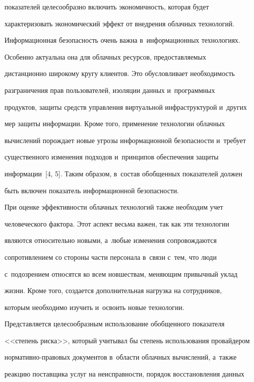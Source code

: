 показателей целесообразно включить экономичность, которая будет 

характеризовать экономический эффект от внедрения облачных технологий. 

  

  Информационная безопасность очень важна в~информационных технологиях. 

Особенно актуальна она для облачных ресурсов, предоставляемых 

дистанционно широкому кругу клиентов. Это обусловливает необходимость 

разграничения прав пользователей, изоляции данных и~программных 

продуктов, защиты средств управления виртуальной инфраструктурой и~других 

мер защиты информации. Кроме того, применение технологии облачных 

вычислений порождает новые угрозы информационной безопасности и~требует 

существенного изменения подходов и~принципов обеспечения защиты 

информации~[4, 5]. Таким образом, в~состав обобщенных показателей должен 

быть включен показатель информационной безопасности.

  

  При оценке эффективности облачных технологий также необходим учет 

человеческого фактора. Этот аспект весьма важен, так как эти технологии 

являются относительно новыми, а~любые изменения сопровождаются 

сопротивлением со стороны части персонала в~связи с~тем, что люди 

с~подозрением относятся ко всем новшествам, меняющим привычный уклад 

жизни. Кроме того, создается дополнительная нагрузка на сотрудников, 

которым необходимо изучить и~освоить новые технологии. 

  

  Представляется целесообразным использование обобщенного показателя 

<<степень риска>>, который учитывал бы степень использования провайдером 

нор\-ма\-тив\-но-пра\-во\-вых документов в~области облачных вычислений, а~также 

реакцию поставщика услуг на неисправности, порядок восстановления данных 


